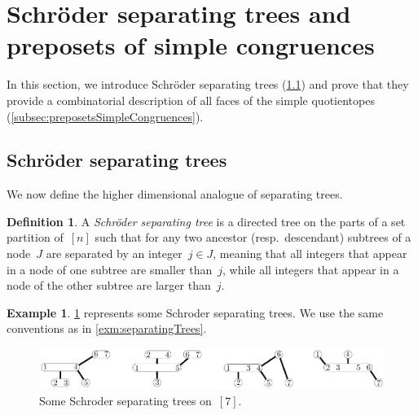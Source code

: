 \documentclass{amsart}
\theoremstyle{definition}
\newtheorem{definition}[theorem]{Definition}
\newtheorem{example}[theorem]{Example}
\newcommand{\darkblue}{\color{darkblue}} %
\newcommand{\defn}[1]{\textsl{\darkblue #1}} %
\newcommand{\vincent}[1]{\todo[color=blue!30]{#1 \\ \hfill --- V.}}
\begin{document}

%


\section{Schröder separating trees and preposets of simple congruences}
\label{sec:SchroderSeparatingTreesPreposetsSimpleCongruences}

In this section, we introduce Schröder separating trees (\cref{subsec:SchroderSeparatingTrees}) and prove that they provide a combinatorial description of all faces of the simple quotientopes (\cref{subsec:preposetsSimpleCongruences}).


\subsection{Schröder separating trees}
\label{subsec:SchroderSeparatingTrees}

We now define the higher dimensional analogue of separating trees.

\begin{definition}
\label{def:ShcroderSeparatingTree}
A \defn{Schröder separating tree} is a directed tree on the parts of a set partition of~$[n]$ such that for any two ancestor (resp.~descendant) subtrees of a node~$J$ are separated by an integer~$j \in J$, meaning that all integers that appear in a node of one subtree are smaller than~$j$, while all integers that appear in a node of the other subtree are larger than~$j$.
\end{definition}

\begin{example}
\label{exm:SchroderSeparatingTrees}
\cref{fig:SchroderSeparatingTrees} represents some Schroder separating trees. We use the same conventions as in \cref{exm:separatingTrees}.
%
\begin{figure}[h]
	\capstart
	\centerline{\includegraphics[scale=.85]{SchroderSeparatingTrees}}
	\caption{Some Schroder separating trees on~$[7]$.}
	\label{fig:SchroderSeparatingTrees}
\end{figure}
%
\end{example}
\end{document}
